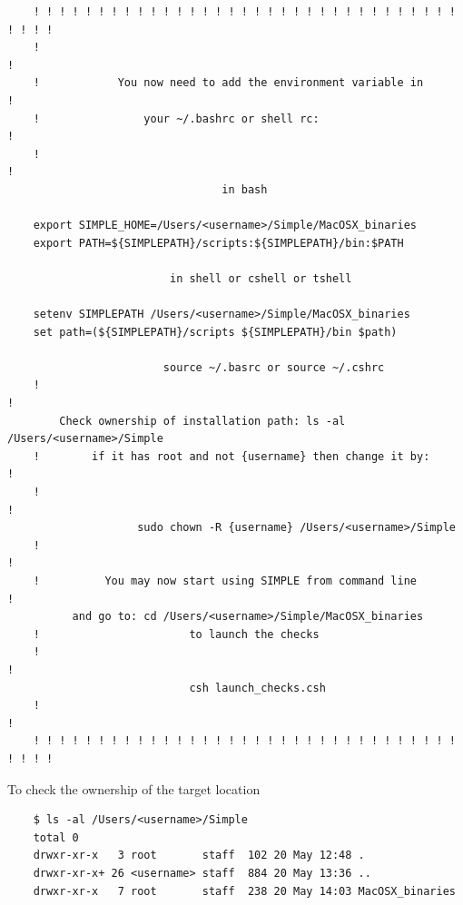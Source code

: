 \documentclass[a4paper,11pt]{article}
\begin{document}
\begin{verbatim}
    ! ! ! ! ! ! ! ! ! ! ! ! ! ! ! ! ! ! ! ! ! ! ! ! ! ! ! ! ! ! ! ! ! ! ! ! !
    !                                                                       !
    !            You now need to add the environment variable in            !
    !                your ~/.bashrc or shell rc:                            !
    !                                                                       !
                                 in bash                                     
                                     
    export SIMPLE_HOME=/Users/<username>/Simple/MacOSX_binaries                                              
    export PATH=${SIMPLEPATH}/scripts:${SIMPLEPATH}/bin:$PATH                
                                                                             
                         in shell or cshell or tshell                        

    setenv SIMPLEPATH /Users/<username>/Simple/MacOSX_binaries                                               
    set path=(${SIMPLEPATH}/scripts ${SIMPLEPATH}/bin $path)                 
                                                                             
                        source ~/.basrc or source ~/.cshrc                   
    !                                                                       !
        Check ownership of installation path: ls -al /Users/<username>/Simple           
    !        if it has root and not {username} then change it by:           !
    !                                                                       !
                    sudo chown -R {username} /Users/<username>/Simple                    
    !                                                                       !
    !          You may now start using SIMPLE from command line             !
          and go to: cd /Users/<username>/Simple/MacOSX_binaries                         
    !                       to launch the checks                             
    !                                                                       !
                            csh launch_checks.csh                            
    !                                                                       !
    ! ! ! ! ! ! ! ! ! ! ! ! ! ! ! ! ! ! ! ! ! ! ! ! ! ! ! ! ! ! ! ! ! ! ! ! !
\end{verbatim}
To check the ownership of the target location
\begin{verbatim}
    $ ls -al /Users/<username>/Simple
    total 0
    drwxr-xr-x   3 root       staff  102 20 May 12:48 .
    drwxr-xr-x+ 26 <username> staff  884 20 May 13:36 ..
    drwxr-xr-x   7 root       staff  238 20 May 14:03 MacOSX_binaries
\end{verbatim}
\end{document}
